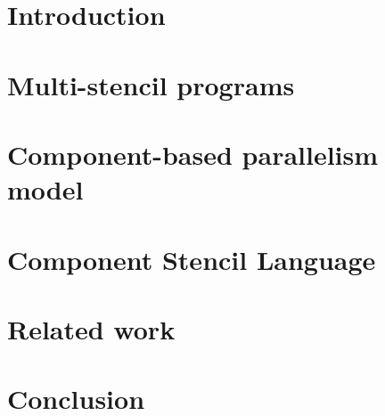 \documentclass[twoside]{article}
\begin{document}
\makeRR   %

\tableofcontents

\section{Introduction}
\label{sect:introduction}
\section{Multi-stencil programs}
\label{sect:formalism}

\section{Component-based parallelism model}
\label{sect:component}

\section{Component Stencil Language}
\label{sect:csm}

\section{Related work}
\label{sect:rel}

\section{Conclusion}
\label{sect:concl}

\label{sect:bib}

\end{document}
